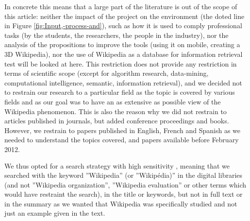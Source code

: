 In concrete this means that a large part of the literature is out
of the scope of this article: neither the impact of the project on
the environment (the doted line in Figure \ref{fig:Input,-process-and}),
such as how it is used to comply professional tasks (by the students,
the researchers, the people in the industry), nor the analysis of
the propositions to improve the tools (using it on mobile, creating
a 3D Wikipedia), nor the use of Wikipedia as a database for information
retrieval test will be looked at here. This restriction does not provide
any restriction in terms of scientific scope (except for algorithm
research, data-mining, computational intelligence, semantic, information
retrieval), and we decided not to restrain our research to a particular
field as the topic is covered by various fields and as our goal was
to have an as extensive as possible view of the Wikipedia phenomenon. 
% 
% 
This is also the reason why we did not restrain to articles published
in journals, but added conference proceedings and books. However,
we restrain to papers published in English, French and Spanish as
we needed to understand the topics covered, and papers available before
February 2012.

We thus opted for a search strategy with high sensitivity \citep{DiestePadua07},
meaning that we searched with the keyword ''Wikipedia'' (or ''Wikip{\'{e}}dia)''
in the digital libraries (and not ''Wikipedia organization'', ''Wikipedia
evaluation'' or other terms which would have restraint the search),
in the title or keywords, but not in full text or in the summary as
we wanted that Wikipedia was specifically studied and not just an
example given in the text.

